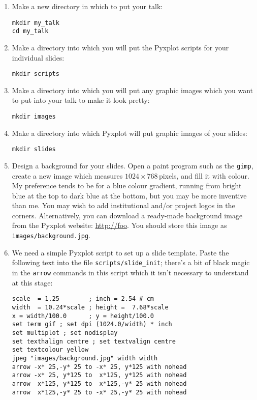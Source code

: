 \begin{enumerate}
\item Make a new directory in which to put your talk:
\begin{verbatim}
mkdir my_talk
cd my_talk
\end{verbatim}
\item Make a directory into which you will put the Pyxplot scripts for your
individual slides:
\begin{verbatim}
mkdir scripts
\end{verbatim}
\item Make a directory into which you will put any graphic images which you
want to put into your talk to make it look pretty:
\begin{verbatim}
mkdir images
\end{verbatim}
\item Make a directory into which Pyxplot will put graphic images of your
slides:
\begin{verbatim}
mkdir slides
\end{verbatim}
\item Design a background for your slides. Open a paint program such as the
{\tt gimp}, create a new image which measures $1024\times768$\,pixels, and fill
it with colour. My preference tends to be for a blue colour gradient, running
from bright blue at the top to dark blue at the bottom, but you may be more
inventive than me. You may wish to add institutional and/or project logos in
the corners. Alternatively, you can download a ready-made background image from
the Pyxplot website: \url{http://foo}. You should store this image as {\tt
images/background.jpg}.
\item We need a simple Pyxplot script to set up a slide template. Paste the
following text into the file {\tt scripts/slide\_init}; there's a bit of black
magic in the {\tt arrow} commands in this script which it isn't necessary to
understand at this stage:\label{stp:presentation_magic}
\begin{verbatim}
scale  = 1.25        ; inch = 2.54 # cm
width  = 10.24*scale ; height =  7.68*scale
x = width/100.0      ; y = height/100.0
set term gif ; set dpi (1024.0/width) * inch
set multiplot ; set nodisplay
set texthalign centre ; set textvalign centre
set textcolour yellow
jpeg "images/background.jpg" width width
arrow -x* 25,-y* 25 to -x* 25, y*125 with nohead
arrow -x* 25, y*125 to  x*125, y*125 with nohead
arrow  x*125, y*125 to  x*125,-y* 25 with nohead
arrow  x*125,-y* 25 to -x* 25,-y* 25 with nohead
\end{verbatim}

\end{enumerate}
